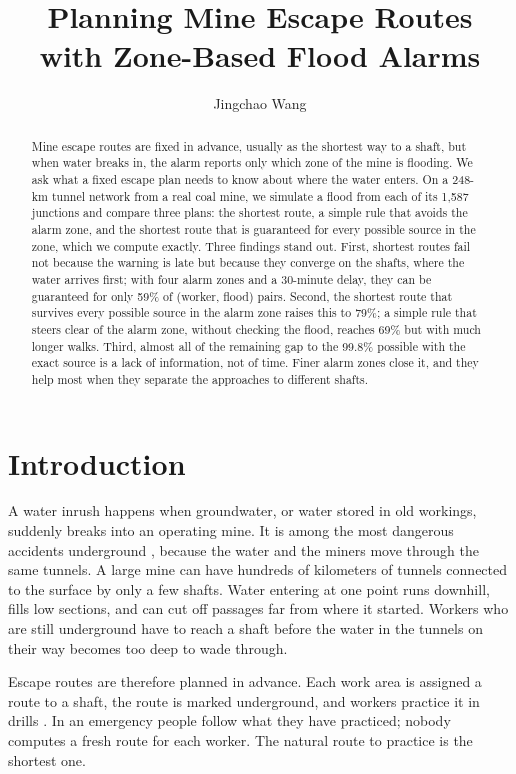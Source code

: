 \documentclass[11pt,a4paper]{article}
\title{Planning Mine Escape Routes\\with Zone-Based Flood Alarms}
\author{Jingchao Wang}
\date{}
\begin{document}
\maketitle
\begin{abstract}
Mine escape routes are fixed in advance, usually as the shortest way to a shaft, but when water breaks in, the alarm reports only which zone of the mine is flooding. We ask what a fixed escape plan needs to know about where the water enters. On a 248-km tunnel network from a real coal mine, we simulate a flood from each of its 1,587 junctions and compare three plans: the shortest route, a simple rule that avoids the alarm zone, and the shortest route that is guaranteed for every possible source in the zone, which we compute exactly. Three findings stand out. First, shortest routes fail not because the warning is late but because they converge on the shafts, where the water arrives first; with four alarm zones and a 30-minute delay, they can be guaranteed for only 59\% of (worker, flood) pairs. Second, the shortest route that survives every possible source in the alarm zone raises this to 79\%; a simple rule that steers clear of the alarm zone, without checking the flood, reaches 69\% but with much longer walks. Third, almost all of the remaining gap to the 99.8\% possible with the exact source is a lack of information, not of time. Finer alarm zones close it, and they help most when they separate the approaches to different shafts.
\end{abstract}

\section{Introduction}
A water inrush happens when groundwater, or water stored in old workings, suddenly breaks into an operating mine. It is among the most dangerous accidents underground \cite{cumcm,sun2016,sun2024}, because the water and the miners move through the same tunnels. A large mine can have hundreds of kilometers of tunnels connected to the surface by only a few shafts. Water entering at one point runs downhill, fills low sections, and can cut off passages far from where it started. Workers who are still underground have to reach a shaft before the water in the tunnels on their way becomes too deep to wade through.

Escape routes are therefore planned in advance. Each work area is assigned a route to a shaft, the route is marked underground, and workers practice it in drills \cite{nrc2013}. In an emergency people follow what they have practiced; nobody computes a fresh route for each worker. The natural route to practice is the shortest one.
\end{document}
